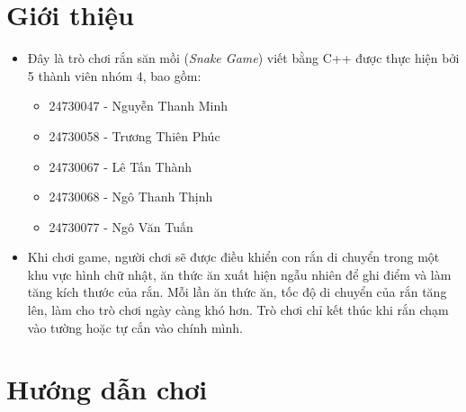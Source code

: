 \documentclass[12pt]{report}
\begin{document}
\section{Giới thiệu}
    \begin{itemize}
        \item Đây là trò chơi rắn săn mồi (\textit{Snake Game}) viết bằng C++ được thực hiện bởi 5 thành viên nhóm 4, bao gồm:
        \begin{itemize}
            \item 24730047 - Nguyễn Thanh Minh
            \item 24730058 - Trương Thiên Phúc
            \item 24730067 - Lê Tấn Thành
            \item 24730068 - Ngô Thanh Thịnh
            \item 24730077 - Ngô Văn Tuấn
        \end{itemize}
        \item Khi chơi game, người chơi sẽ được điều khiển con rắn di chuyển trong một khu vực hình chữ nhật, ăn thức ăn xuất hiện ngẫu nhiên để ghi điểm và làm tăng kích thước của rắn. Mỗi lần ăn thức ăn, tốc độ di chuyển của rắn tăng lên, làm cho trò chơi ngày càng khó hơn. Trò chơi chỉ kết thúc khi rắn chạm vào tường hoặc tự cắn vào chính mình.
    \end{itemize}

\section{Hướng dẫn chơi}
\end{document}

